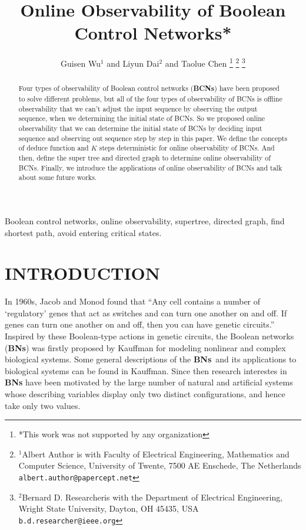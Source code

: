 \documentclass[letterpaper, 10 pt, conference]{ieeeconf}  %
\title{\LARGE \bf
Online Observability of Boolean Control Networks*
}
\author{Guisen Wu$^{1}$ and Liyun Dai$^{2}$ and Taolue Chen%
\thanks{*This work was not supported by any organization}%
\thanks{$^{1}$Albert Author is with Faculty of Electrical Engineering, Mathematics and Computer Science,
        University of Twente, 7500 AE Enschede, The Netherlands
        {\tt\small albert.author@papercept.net}}%
\thanks{$^{2}$Bernard D. Researcheris with the Department of Electrical Engineering, Wright State University,
        Dayton, OH 45435, USA
        {\tt\small b.d.researcher@ieee.org}}%
}
\def \BNs {{\bf BNs}}
\begin{document}
\maketitle
\thispagestyle{empty}
\pagestyle{empty}


\begin{abstract}

Four types of observability of Boolean control networks ({\bf BCNs}) have been proposed to solve different problems, but all of the four types of observability of BCNs is offline observability that we can't adjust the input sequence by observing the output sequence, when we determining the initial state of BCNs. So we proposed online observability that we can determine the initial state of BCNs by deciding input sequence and observing out sequence step by step in this paper. We define the concepts of deduce function and $K$ steps deterministic for online observability of BCNs. And then, define the super tree and directed graph to determine online observability of BCNs. Finally, we introduce the applications of online observability of BCNs and talk about some future works.
\end{abstract}


\begin{keywords}

Boolean control networks, online observability, supertree, directed graph, find shortest path, avoid entering critical states. 

\end{keywords}

\section{INTRODUCTION}

In 1960s, Jacob and Monod found that  ``Any cell contains a number of `regulatory' genes that act as switches and can turn one another on and off. If genes can turn one another on and off, then you can have genetic circuits.''  Inspired by these Boolean-type actions in genetic circuits, the Boolean networks ({\bf BNs}) was firstly proposed by Kauffman for modeling nonlinear and complex biological systems. Some general descriptions of the \BNs\ and its applications to biological systems can be found in Kauffman. Since then research interestes in {\bf BNs} have been motivated by the large number of natural and artificial systems whose describing variables display only two distinct configurations, and hence take only two values.
\end{document}
